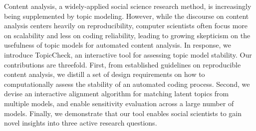 Content analysis, a widely-applied social science research method, is increasingly being supplemented by topic modeling. However, while the discourse on content analysis centers heavily on reproducibility, computer scientists often focus more on scalability and less on coding reliability, leading to growing skepticism on the usefulness of topic models for automated content analysis. In response, we introduce TopicCheck, an interactive tool for assessing topic model stability. Our contributions are threefold. First, from established guidelines on reproducible content analysis, we distill a set of design requirements on how to computationally assess the stability of an automated coding process. Second, we devise an interactive alignment algorithm for matching latent topics from multiple models, and enable sensitivity evaluation across a large number of models. Finally, we demonstrate that our tool enables social scientists to gain novel insights into three active research questions.
